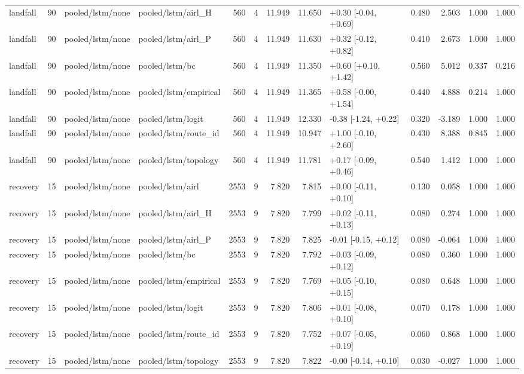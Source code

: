 \begin{tabular}{lrllrrrrlrrll}
landfall & 90 & pooled/lstm/none & pooled/lstm/airl_H & 560 & 4 & 11.949 & 11.650 & +0.30 [-0.04, +0.69] & 0.480 & 2.503 & 1.000 & 1.000 \\
landfall & 90 & pooled/lstm/none & pooled/lstm/airl_P & 560 & 4 & 11.949 & 11.630 & +0.32 [-0.12, +0.82] & 0.410 & 2.673 & 1.000 & 1.000 \\
landfall & 90 & pooled/lstm/none & pooled/lstm/bc & 560 & 4 & 11.949 & 11.350 & +0.60 [+0.10, +1.42] & 0.560 & 5.012 & 0.337 & 0.216 \\
landfall & 90 & pooled/lstm/none & pooled/lstm/empirical & 560 & 4 & 11.949 & 11.365 & +0.58 [-0.00, +1.54] & 0.440 & 4.888 & 0.214 & 1.000 \\
landfall & 90 & pooled/lstm/none & pooled/lstm/logit & 560 & 4 & 11.949 & 12.330 & -0.38 [-1.24, +0.22] & 0.320 & -3.189 & 1.000 & 1.000 \\
landfall & 90 & pooled/lstm/none & pooled/lstm/route_id & 560 & 4 & 11.949 & 10.947 & +1.00 [-0.10, +2.60] & 0.430 & 8.388 & 0.845 & 1.000 \\
landfall & 90 & pooled/lstm/none & pooled/lstm/topology & 560 & 4 & 11.949 & 11.781 & +0.17 [-0.09, +0.46] & 0.540 & 1.412 & 1.000 & 1.000 \\
recovery & 15 & pooled/lstm/none & pooled/lstm/airl & 2553 & 9 & 7.820 & 7.815 & +0.00 [-0.11, +0.10] & 0.130 & 0.058 & 1.000 & 1.000 \\
recovery & 15 & pooled/lstm/none & pooled/lstm/airl_H & 2553 & 9 & 7.820 & 7.799 & +0.02 [-0.11, +0.13] & 0.080 & 0.274 & 1.000 & 1.000 \\
recovery & 15 & pooled/lstm/none & pooled/lstm/airl_P & 2553 & 9 & 7.820 & 7.825 & -0.01 [-0.15, +0.12] & 0.080 & -0.064 & 1.000 & 1.000 \\
recovery & 15 & pooled/lstm/none & pooled/lstm/bc & 2553 & 9 & 7.820 & 7.792 & +0.03 [-0.09, +0.12] & 0.080 & 0.360 & 1.000 & 1.000 \\
recovery & 15 & pooled/lstm/none & pooled/lstm/empirical & 2553 & 9 & 7.820 & 7.769 & +0.05 [-0.10, +0.15] & 0.080 & 0.648 & 1.000 & 1.000 \\
recovery & 15 & pooled/lstm/none & pooled/lstm/logit & 2553 & 9 & 7.820 & 7.806 & +0.01 [-0.08, +0.10] & 0.070 & 0.178 & 1.000 & 1.000 \\
recovery & 15 & pooled/lstm/none & pooled/lstm/route_id & 2553 & 9 & 7.820 & 7.752 & +0.07 [-0.05, +0.19] & 0.060 & 0.868 & 1.000 & 1.000 \\
recovery & 15 & pooled/lstm/none & pooled/lstm/topology & 2553 & 9 & 7.820 & 7.822 & -0.00 [-0.14, +0.10] & 0.030 & -0.027 & 1.000 & 1.000 \\

\end{tabular}
